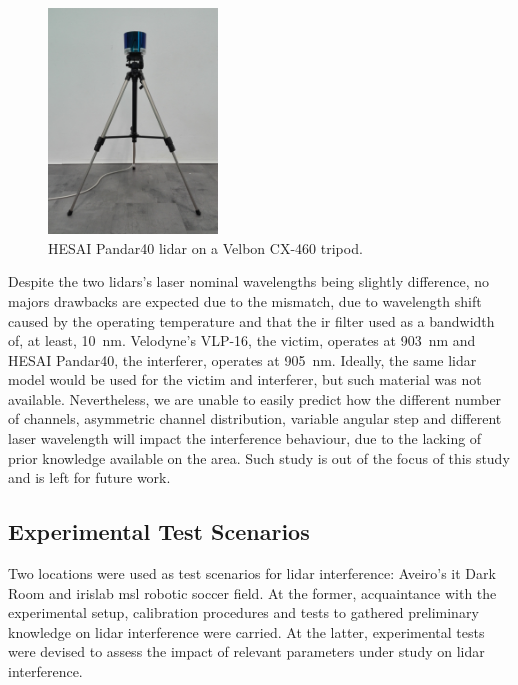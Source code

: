 \begin{figure}[!ht]
\centering
\includegraphics[width=0.4\textwidth]{img/experimental-setup/pandar40-on-tripod.jpg}
\caption[HESAI Pandar40 \acs{lidar} on a Velbon CX-460 tripod.]{HESAI Pandar40 \ac{lidar} on a Velbon CX-460 tripod.}
\label{fig:pandar40-on-tripod}
\end{figure}

Despite the two \acp{lidar}'s laser nominal wavelengths being slightly difference, no majors drawbacks are expected due to the mismatch, due to wavelength shift caused by the operating temperature and that the \ac{ir} filter used as a bandwidth of, at least, \SI{10}{\nano\meter}. Velodyne's VLP-16, the victim, operates at \SI{903}{\nano\meter} and HESAI Pandar40, the interferer, operates at \SI{905}{\nano\meter}. Ideally, the same \ac{lidar} model would be used for the victim and interferer, but such material was not available. Nevertheless, we are unable to easily predict how the different number of channels, asymmetric channel distribution, variable angular step and different laser wavelength will impact the interference behaviour, due to the lacking of prior knowledge available on the area. Such study is out of the focus of this study and is left for future work.

\subsection{Experimental Test Scenarios}
\label{subsec:lidar-interference:test-scenarios}

Two locations were used as test scenarios for \ac{lidar} interference: Aveiro's \ac{it} Dark Room and \ac{irislab} \ac{msl} robotic soccer field. At the former, acquaintance with the experimental setup, calibration procedures and tests to gathered preliminary knowledge on \ac{lidar} interference were carried. At the latter, experimental tests were devised to assess the impact of relevant parameters under study on \ac{lidar} interference. 

